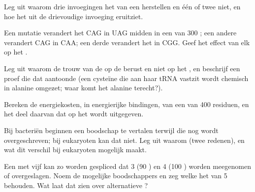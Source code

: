 \begin{exercise}[$\star\star$]\label{exo:b1:gene-expression:6}
Leg uit waarom drie invoegingen het  van een  herstellen en één of twee
niet, en hoe het  uit de drievoudige invoeging eruitziet.
\end{exercise}

\begin{exercise}[$\star\star$]\label{exo:b1:gene-expression:7}
Een mutatie verandert het  CAG in UAG midden in een  van \qty{300}{}
; een andere verandert CAG in CAA; een derde verandert het in CGG. Geef het
effect van elk op het .
\end{exercise}

\begin{exercise}[$\star\star$]\label{exo:b1:gene-expression:8}
Leg uit waarom de trouw van de  op de  berust
en niet op het , en beschrijf een proef die dat aantoonde (een cysteïne die
aan haar tRNA vastzit wordt chemisch in alanine omgezet; waar komt het alanine
terecht?).
\end{exercise}

\begin{exercise}[$\star\star$]\label{exo:b1:gene-expression:9}
Bereken de energiekosten, in energierijke bindingen, van een  van \qty{400}{}
residuen, en het deel daarvan dat op het  wordt uitgegeven.
\end{exercise}

\begin{exercise}[$\star\star\star$]\label{exo:b1:gene-expression:10}
Bij bacteriën beginnen  een boodschap te vertalen terwijl die nog wordt
overgeschreven; bij eukaryoten kan dat niet. Leg uit waarom (twee redenen), en wat
dit verschil bij eukaryoten mogelijk maakt.
\end{exercise}

\begin{exercise}[$\star\star\star$]\label{exo:b1:gene-expression:11}
Een  met vijf  kan zo worden gespliced dat  3 (\qty{90}{} )
en  4 (\qty{100}{} ) worden meegenomen of overgeslagen. Noem de
mogelijke boodschappers en zeg welke het  van  5 behouden. Wat laat dat
zien over alternatieve ?
\end{exercise}

